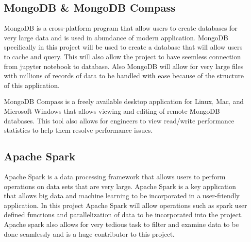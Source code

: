 \documentclass[conference,twoside]{IEEEtran}
\begin{document}
\subsection{MongoDB \& MongoDB Compass}
MongoDB is a cross-platform program that allow users to create databases for very large data and is used in abundance of modern application. MongoDB specifically in this project will be used to create a database that will allow users to cache and query. This will also allow the project to have seemless connection from jupyter notebook to database. Also MongoDB will allow for very large files with millions of records of data to be handled with ease because of the structure of this application\cite{mongodb}.

MongoDB Compass is a freely available desktop application for Linux, Mac, and Microsoft Windows that allows viewing and editing of remote MongoDB databases. This tool also allows for engineers to view read/write performance statistics to help them resolve performance issues\cite{mongodbcompass}.

\subsection{Apache Spark}
Apache Spark is a data processing framework that allows users to perform operations on data sets that are very large. Apache Spark is a key application that allows big data and machine learning to be incorporated in a user-friendly application. In this project Apache Spark will allow operations such as spark user defined functions and parallelization of data to be incorporated into the project. Apache spark also allows for very tedious task to filter and examine data to be done seamlessly and is a huge contributor to this project\cite{spark}.


\end{document}
